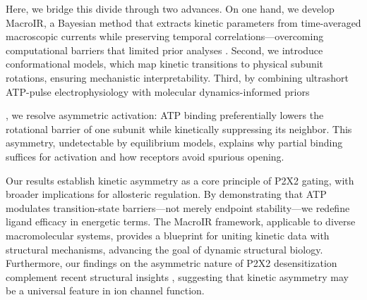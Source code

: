 \documentclass[pdflatex,sn-mathphys-num]{sn-jnl}%
\theoremstyle{thmstyleone}%
\theoremstyle{thmstyletwo}%
\theoremstyle{thmstylethree}%
\begin{document}
Here, we bridge this divide through two advances. On one hand, we develop MacroIR, a Bayesian method that extracts kinetic parameters from time-averaged macroscopic currents while preserving temporal correlations—overcoming computational barriers that limited prior analyses \cite{Moffatt}. Second, we introduce conformational models, which map kinetic transitions to physical subunit rotations\cite{piedominici_p2x_1}, ensuring mechanistic interpretability. Third, by combining ultrashort ATP-pulse electrophysiology \cite{Moffatt_hume} with molecular dynamics-informed priors , we resolve asymmetric activation: ATP binding preferentially lowers the rotational barrier of one subunit while kinetically suppressing its neighbor. This asymmetry, undetectable by equilibrium models, explains why partial binding suffices for activation and how receptors avoid spurious opening.

Our results establish kinetic asymmetry as a core principle of P2X2 gating, with broader implications for allosteric regulation. By demonstrating that ATP modulates transition-state barriers—not merely endpoint stability—we redefine ligand efficacy in energetic terms. The MacroIR framework, applicable to diverse macromolecular systems, provides a blueprint for uniting kinetic data with structural mechanisms, advancing the goal of dynamic structural biology. Furthermore, our findings on the asymmetric nature of P2X2 desensitization complement recent structural insights \cite{Samways2021}, suggesting that kinetic asymmetry may be a universal feature in ion channel function.

\end{document}
